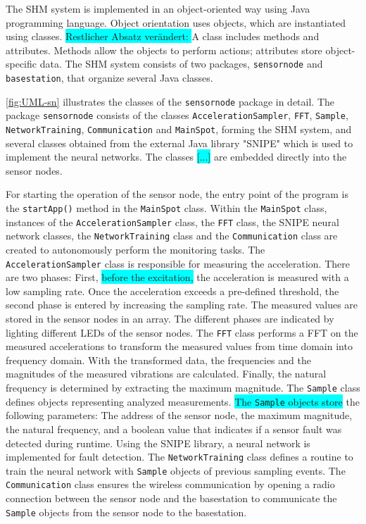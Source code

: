 \documentclass[12pt,a4paper]{scrartcl}
\begin{document}
The SHM system is implemented in an object-oriented way using Java programming language. 
Object orientation uses objects, which are instantiated using classes. 
\colorbox{cyan}{Restlicher Absatz verändert: }
A class includes methods and attributes.
Methods allow the objects to perform actions; attributes store object-specific data.
The SHM system consists of two packages, \texttt{sensornode} and \texttt{basestation}, that organize several Java classes.

\autoref{fig:UML-sn} illustrates the classes of the \texttt{sensor\-node} package in detail.
The package \texttt{sensor\-node} consists of the classes \texttt{Acceleration\-Sampler}, \texttt{FFT}, \texttt{Sample}, \texttt{Network\-Training}, \texttt{Communi\-cation} and \texttt{Main\-Spot}, forming the SHM system, and several classes obtained from the external Java library "SNIPE" \citep{SNIPE} which is used to implement the neural networks.
The classes \colorbox{cyan}{[...]} are embedded directly into the sensor nodes.

For starting the operation of the sensor node, the entry point of the program is the \texttt{start\-App()} method in the \texttt{Main\-Spot} class. 
Within the \texttt{Main\-Spot} class, instances of the \texttt{Acceleration\-Sampler} class, the \texttt{FFT} class, the SNIPE neural network classes, the \texttt{Network\-Training} class and the \texttt{Communi\-cation} class are created to autonomously perform the monitoring tasks.
The \texttt{Acceleration\-Sampler} class is responsible for measuring the acceleration.
There are two phases: First, \colorbox{cyan}{before the excitation,} the acceleration is measured with a low sampling rate.
Once the acceleration exceeds a pre-defined threshold, the second phase is entered by increasing the sampling rate. 
The measured values are stored in the sensor nodes in an array.
The different phases are indicated by lighting different LEDs of the sensor nodes.
The \texttt{FFT} class performs a FFT on the measured accelerations to transform the measured values from time domain into frequency domain. 
With the transformed data, the frequencies and the magnitudes of the measured vibrations are calculated.
Finally, the natural frequency is determined by extracting the maximum magnitude.
The \texttt{Sample} class defines objects representing analyzed measurements.
\colorbox{cyan}{The \texttt{Sample} objects store} the following parameters: The address of the sensor node, the maximum magnitude, the natural frequency, and a boolean value that indicates if a sensor fault was detected during runtime.
Using the SNIPE library, a neural network is implemented for fault detection.
The \texttt{Network\-Training} class defines a routine to train the neural network with \texttt{Sample} objects of previous sampling events.
The \texttt{Communi\-cation} class ensures the wireless communication by opening a radio connection between the sensor node and the basestation to communicate the \texttt{Sample} objects from the sensor node to the basestation.
\end{document}
